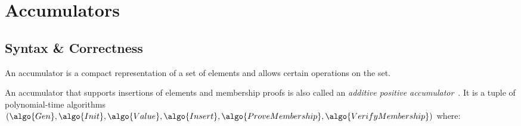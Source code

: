 \section{Accumulators}\label{sec:accumulators}

\subsection{Syntax \& Correctness}

An accumulator is a compact representation of a set of elements and allows certain operations on the set.

\begin{definition}[Accumulator]\label{def:accumulator}
An accumulator that supports insertions of elements and membership proofs is also called an \emph{additive positive accumulator}~\cite{RSA:BalCanYak20}.
It is a tuple of polynomial-time algorithms $(\algo{Gen}, \algo{Init}, \algo{Value}, \algo{Insert}, \algo{ProveMembership}, \algo{VerifyMembership})$ where:


\end{definition}
